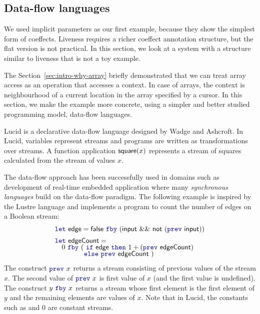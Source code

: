 
\subsection{Data-flow languages}
\label{sec:applications-flat-dataflow}

We used implicit parameters as our first example, because they show the simplest form of coeffects.
Liveness requires a richer coeffect annotation structure, but the flat version is not practical.
In this section, we look at a system with a structure similar to liveness that is not a toy example.

The Section~\ref{sec:intro-why-array} briefly demonstrated that we can treat array access as an
operation that accesses a context. In case of arrays, the context is neighbourhood of a current
location in the array specified by a cursor. In this section, we make the example more concrete,
using a simpler and better studied programming model, data-flow languages.

Lucid \cite{app-lucid} is a declarative data-flow language designed by Wadge and Ashcroft. In Lucid,
variables represent streams and programs are written as transformations over streams. A function
application $\textnormal{\sffamily square}(x)$ represents a stream of squares calculated from the stream of values $x$.

The data-flow approach has been successfully used in domains such as development of real-time embedded
application where many \emph{synchronous languages} \cite{app-synchronous-lang} build on the data-flow
paradigm. The following example is inspired by the Lustre \cite{app-synchronous-lustre} language
and implements a program to count the number of edges on a Boolean stream:
%
\begin{equation*}
\begin{array}{l}
\kvd{let}~\ident{edge} = \ident{false}~\kvd{fby}~(\ident{input}~\&\&~\ident{not}~(\kvd{prev}~\ident{input}))
\\[0.5em]
\kvd{let}~\ident{edgeCount} = \\[-0.25em]
\quad 0~\kvd{fby}~ (~\kvd{if}~\ident{edge}~\kvd{then}~1 + (\kvd{prev}~\ident{edgeCount})\\[-0.25em]
\quad\quad\quad~~~\, \kvd{else}~\kvd{prev}~\ident{edgeCount} ~)
\end{array}
\end{equation*}
%
The construct $\kvd{prev}~x$ returns a stream consisting of previous values of the stream
$x$. The second value of $\kvd{prev}~x$ is first value of $x$ (and the first
value is undefined). The construct $y~\kvd{fby}~x$ returns a stream whose first element is the
first element of $y$ and the remaining elements are values of $x$. Note that in Lucid, the constants
such as  and $0$ are constant streams.

